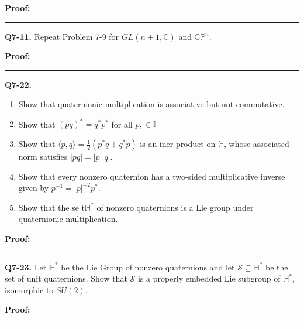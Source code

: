 \documentclass{article}
\newcommand{\C}{\mathbb{C}}
\begin{document}
\vskip 0.5cm
\textbf{Proof:}


\vskip 0.5cm
\hrule 
\vskip 0.5cm


\textbf{Q7-11.} Repeat Problem 7-9 for $GL(n+1, \C)$ and $\mathbb{CP}^n$.

\vskip 0.5cm
\textbf{Proof:}


\vskip 0.5cm
\hrule 
\vskip 0.5cm


\textbf{Q7-22.} 
\begin{enumerate}[label=(\alph*)]
  \item Show that quaternionic multiplication is associative but not commutative.
  \item Show that $(pq)^* = q^* p^*$ for all $p, \in \mathbb{H}$
  \item Show that $\langle p, q \rangle = \frac{1}{2}\left(p^* q + q^* p\right)$ is an iner product on $\mathbb{H}$, whose associated norm satisfies $|pq| = |p||q|$.
  \item Show that every nonzero quaternion has a two-sided multiplicative inverse given by $p^{-1} = |p|^{-2} p^*$.
  \item Show that the se t$\mathbb{H}^*$ of nonzero quaternions is a Lie group under quaternionic multiplication.
\end{enumerate}


\vskip 0.5cm
\textbf{Proof:}


\vskip 0.5cm
\hrule 
\vskip 0.5cm


\textbf{Q7-23.} Let $\mathbb{H}^*$ be the Lie Group of nonzero quaternions and let $\mathcal{S} \subseteq \mathbb{H}^*$ be the set of unit quaternions. Show that $\mathcal{S}$ is a properly embedded Lie subgroup of $\mathbb{H}^*$, isomorphic to $SU(2)$. 

\vskip 0.5cm
\textbf{Proof:}


\vskip 0.5cm
\hrule 
\vskip 0.5cm









\end{document}
